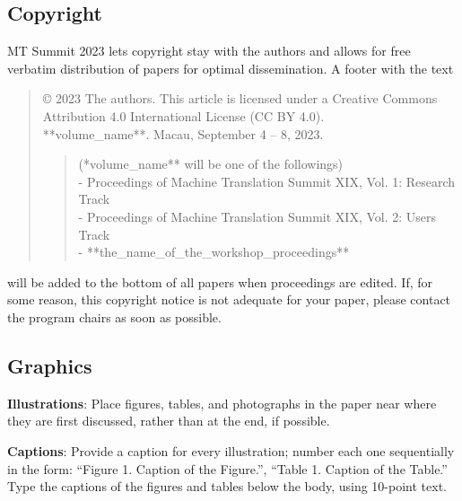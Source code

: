 \documentclass[]{article}
\newcommand{\confname}{MT Summit 2023}
\begin{document}
\subsection{Copyright}


\confname{} lets copyright stay with the authors and allows for free verbatim distribution of papers for optimal dissemination. A footer with the text
\begin{quote}
\begin{small}
\begin{it}
  \copyright{} 2023 The authors.  This article is licensed under a Creative Commons Attribution 4.0 International License (CC BY 4.0).\\
  **volume\_name**. Macau, September 4 -- 8, 2023.
  \begin{quote}
  (*volume\_name** will be one of the followings)\\
  - Proceedings of Machine Translation Summit XIX, Vol. 1: Research Track\\
  - Proceedings of Machine Translation Summit XIX, Vol. 2: Users Track\\
  - **the\_name\_of\_the\_workshop\_proceedings**
  \end{quote}
\end{it}
\end{small}
\end{quote}
will be added to the bottom of all papers when proceedings are
edited. If, for some reason, this copyright notice is not adequate for
your paper, please contact the program chairs as soon as possible.

\subsection{Graphics}

{\bf Illustrations}: Place figures, tables, and photo\-graphs in the
paper near where they are first discussed, rather than at the end, if
possible.

{\bf Captions}: Provide a caption for every illustration; number
each one sequentially in the form:  ``Figure 1. Caption of the
Figure.'', ``Table 1. Caption of the Table.''  Type the captions of
the figures and tables below the body, using 10-point text.
\end{document}
